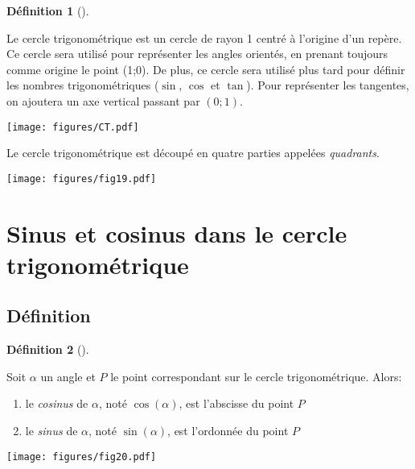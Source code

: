 \documentclass[
  a4paper,
  DIV=11,
  numbers=noendperiod,
  oneside]{scrreprt}
\providecommand{\tightlist}{%
  \setlength{\itemsep}{0pt}\setlength{\parskip}{0pt}}\usepackage{longtable,booktabs,array}
\theoremstyle{definition}
\newtheorem{definition}{Définition}[chapter]
\theoremstyle{definition}
\theoremstyle{plain}
\theoremstyle{definition}
\theoremstyle{remark}
\begin{document}
\begin{definition}[]\protect\hypertarget{def-ct}{}\label{def-ct}

Le cercle trigonométrique est un cercle de rayon 1 centré à l'origine
d'un repère. Ce cercle sera utilisé pour représenter les angles
orientés, en prenant toujours comme origine le point (1;0). De plus, ce
cercle sera utilisé plus tard pour définir les nombres trigonométriques
(\(\sin\), \(\cos\) et \(\tan\)). Pour représenter les tangentes, on
ajoutera un axe vertical passant par \((0;1)\).

\begin{center}
\texttt{[image: figures/CT.pdf]}
\end{center}

\end{definition}

Le cercle trigonométrique est découpé en quatre parties appelées
\emph{quadrants}.

\begin{center}
\texttt{[image: figures/fig19.pdf]}
\end{center}

\section{Sinus et cosinus dans le cercle
trigonométrique}\label{sinus-et-cosinus-dans-le-cercle-trigonomuxe9trique}

\subsection{Définition}\label{duxe9finition}

\begin{definition}[]\protect\hypertarget{def-sincos}{}\label{def-sincos}

Soit \(\alpha\) un angle et \(P\) le point correspondant sur le cercle
trigonométrique. Alors:

\begin{enumerate}
\def\labelenumi{\arabic{enumi}.}
\tightlist
\item
  le \emph{cosinus} de \(\alpha\), noté \(\cos(\alpha)\), est l'abscisse
  du point \(P\)
\item
  le \emph{sinus} de \(\alpha\), noté \(\sin(\alpha)\), est l'ordonnée
  du point \(P\)
\end{enumerate}

\begin{center}
\texttt{[image: figures/fig20.pdf]}
\end{center}

\end{definition}
\end{document}
